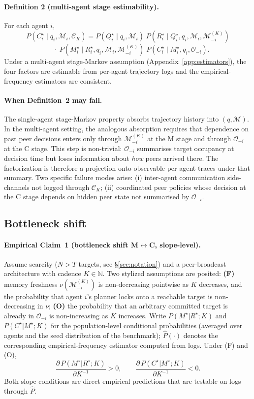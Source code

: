 \documentclass{article}
\begin{document}
\paragraph{Definition 2 (multi-agent stage estimability).}
For each agent $i$,
\[
P(C^\star_i \mid q_i, \mathcal{M}_i, \mathcal{C}_K)
=
P(Q^\star_i \mid q_i, \mathcal{M}_i)\;
P(R^\star_i \mid Q^\star_i, q_i, \mathcal{M}_i, \mathcal{M}_{-i}^{(K)})
\]
\[
\quad \cdot\;
P(M^\star_i \mid R^\star_i, q_i, \mathcal{M}_i, \mathcal{M}_{-i}^{(K)})\;
P(C^\star_i \mid M^\star_i, q_i, \mathcal{O}_{-i}).
\]
Under a multi-agent stage-Markov assumption
(Appendix~\ref{app:estimators}), the four factors are estimable from
per-agent trajectory logs and the empirical-frequency estimators are
consistent.

\paragraph{When Definition~2 may fail.}
The single-agent stage-Markov property absorbs trajectory history into
$(q, \mathcal{M})$. In the multi-agent setting, the analogous
absorption requires that dependence on past peer decisions enters only
through $\mathcal{M}_{-i}^{(K)}$ at the M stage and through
$\mathcal{O}_{-i}$ at the C stage. This step is non-trivial:
$\mathcal{O}_{-i}$ summarises target occupancy at decision time but
loses information about \emph{how} peers arrived there. The
factorization is therefore a projection onto observable per-agent
traces under that summary. Two specific failure modes arise: (i)
inter-agent communication side-channels not logged through
$\mathcal{C}_K$; (ii) coordinated peer policies whose decision at the
C stage depends on hidden peer state not summarised by
$\mathcal{O}_{-i}$.

\subsection{Bottleneck shift}
\label{sec:shift}

\paragraph{Empirical Claim~1 (bottleneck shift M$\leftrightarrow$C, slope-level).}
Assume scarcity ($N > T$ targets, see \S\ref{sec:notation}) and a
peer-broadcast architecture with cadence $K \in \mathbb{N}$. Two
stylized assumptions are posited:
\textbf{(F)} memory freshness $\nu(\mathcal{M}_{-i}^{(K)})$ is
non-decreasing pointwise as $K$ decreases, and the probability that
agent $i$'s planner locks onto a reachable target is non-decreasing in
$\nu$;
\textbf{(O)} the probability that an arbitrary committed target is
already in $\mathcal{O}_{-i}$ is non-increasing as $K$ increases.
Write $P(M^\star|R^\star;K)$ and $P(C^\star|M^\star;K)$ for the
population-level conditional probabilities (averaged over agents and
the seed distribution of the benchmark); $\hat{P}(\cdot)$ denotes the
corresponding empirical-frequency estimator computed from logs. Under
(F) and (O),
\[
\frac{\partial\, P(M^\star|R^\star;K)}{\partial K^{-1}} > 0,
\qquad
\frac{\partial\, P(C^\star|M^\star;K)}{\partial K^{-1}} < 0.
\]
Both slope conditions are direct empirical predictions that are
testable on logs through $\hat{P}$.
\end{document}
